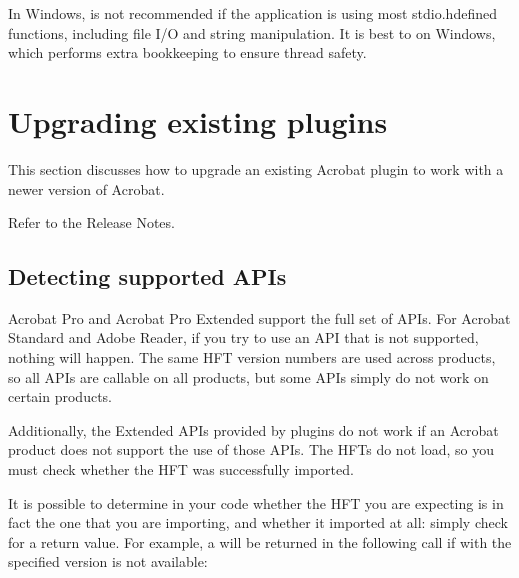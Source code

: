 \documentclass[letterpaper,12pt,english,openany,oneside]{sphinxmanual}
\begin{document}
In Windows,  is not recommended if the application is using most stdio.h\sphinxhyphen{}defined functions, including file I/O and string manipulation. It is best to  on Windows, which performs extra bookkeeping to ensure thread safety.


\section{Upgrading existing plugins}
\label{\detokenize{Plugins_CreatingSimplePlug:upgrading-existing-plugins}}
This section discusses how to upgrade an existing Acrobat plugin to work with a newer version of Acrobat.

Refer to the Release Notes.


\subsection{Detecting supported APIs}
\label{\detokenize{Plugins_CreatingSimplePlug:detecting-supported-apis}}
Acrobat Pro and Acrobat Pro Extended support the full set of APIs. For Acrobat Standard and Adobe Reader, if you try to use an API that is not supported, nothing will happen. The same HFT version numbers are used across products, so all APIs are callable on all products, but some APIs simply do not work on certain products.

Additionally, the Extended APIs provided by plugins do not work if an Acrobat product does not support the use of those APIs. The HFTs do not load, so you must check whether the HFT was successfully imported.

It is possible to determine in your code whether the HFT you are expecting is in fact the one that you are importing, and whether it imported at all: simply check for a  return value. For example, a  will be returned in the following call if  with the specified version is not available:

\begin{sphinxVerbatim}[commandchars=\\\{\}]
  
\end{sphinxVerbatim}
\end{document}
